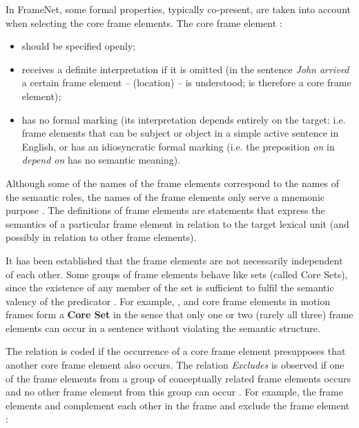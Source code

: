 \documentclass[output=paper,colorlinks,citecolor=brown]{langscibook}
\begin{document}
In FrameNet, some formal properties, typically co-present, are taken into account when selecting the core frame elements. The core frame element \citep[23–24]{Ruppenhofer2016}:
\begin{itemize}

\item{should be specified openly};
\item{receives a definite interpretation if it is omitted (in the sentence \emph{John arrived} a certain frame element --  (location) -- is understood;  is therefore a core frame element)};
\item{has no formal marking (its interpretation depends entirely on the target: i.e. frame elements that can be subject or object in a simple active sentence in English, or has an idiosyncratic formal marking (i.e. the preposition \textit{on} in \textit{depend on} has no semantic meaning)}.
\end{itemize}

Although some of the names of the frame elements correspond to the names of the semantic roles, the names of the frame elements only serve a mnemonic purpose \citep[237]{Fillmore2003}. The definitions of frame elements are statements that express the semantics of a particular frame element in relation to the target lexical unit (and possibly in relation to other frame elements).

It has been established that the frame elements are not necessarily independent of each other. 
Some groups of frame elements behave like sets (called Core Sets), since the existence of any member of the set is sufficient to fulfil the semantic valency of the predicator \citep[25]{Ruppenhofer2016}. For example, ,  and  core frame elements in motion frames form a \textbf{Core Set} in the sense that only one or two (rarely all three) frame elements can occur in a sentence without violating the semantic structure.

The relation  is coded if the occurrence of a core frame element presupposes that another core frame element also occurs. The relation \textit{Excludes} is observed if one of the frame elements from a group of conceptually related frame elements occurs and no other frame element from this group can occur \citep[26]{Ruppenhofer2016}. For example, the frame elements  and  complement each other in the frame  and exclude the frame element :
\end{document}
